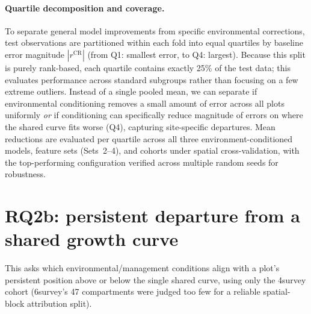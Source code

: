 \paragraph*{Quartile decomposition and coverage.} To separate general model improvements from specific environmental corrections, test observations are partitioned within each fold into equal quartiles by baseline error magnitude $|r^{\text{CR}}|$ (from Q1: smallest error, to Q4: largest). Because this split is purely rank-based, each quartile contains exactly 25\% of the test data; this evaluates performance across standard subgroups rather than focusing on a few extreme outliers. Instead of a single pooled mean, we can separate if environmental conditioning removes a small amount of error across all plots uniformly \textit{or} if conditioning can specifically reduce magnitude of errors on where the shared curve fits worse (Q4), capturing site-specific departures. Mean reductions are evaluated per quartile across all three environment-conditioned models, feature sets (Sets~2--4), and cohorts under spatial cross-validation, with the top-performing configuration verified across multiple random seeds for robustness. %

\section{RQ2b: persistent departure from a shared growth curve}
\label{sec:rq2b}
This asks which environmental/management conditions align with a plot's persistent position above or below the single shared curve, using only the 4survey cohort (6survey's 47 compartments were judged too few for a reliable spatial-block attribution split).

